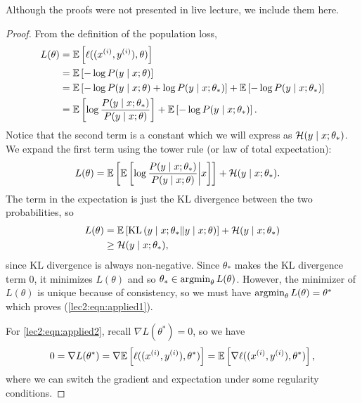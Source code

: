 Although the proofs were not presented in live lecture, we include them here.

\begin{proof}
From the definition of the population loss,
\begin{align}
    L(\theta) &= \mathbb{E} \left[ \ell((x^{(i)}, y^{(i)}), \theta) \right]\\
    &= \mathbb{E} \left[ - \log P(y \mid x; \theta) \right] \\
    &= \mathbb{E} \left[ - \log P(y \mid x; \theta) + \log P(y \mid x; \theta_*) \right] + \mathbb{E} \left[ - \log P(y \mid x; \theta_*) \right] \\
    &= \mathbb{E} \left[ \log \frac{P(y \mid x; \theta_*)}{P(y \mid x; \theta)} \right] + \mathbb{E} \left[ - \log P(y \mid x; \theta_*) \right].
\end{align}
Notice that the second term is a constant which we will express as $\mathcal H(y \mid x; \theta_*)$. We expand the first term using the tower rule (or law of total expectation):
\begin{align}
    L(\theta) &= \mathbb{E} \left[ \mathbb{E} \left[ \log \frac{P(y \mid x; \theta_*)}{P(y \mid x; \theta)} \biggr\vert x \right] \right] + \mathcal H(y \mid x; \theta_*).
\end{align}
The term in the expectation is just the KL divergence between the two probabilities, so 
\begin{align}
    L(\theta) &= \mathbb{E} \left[ \operatorname{KL} \left( y \mid x; \theta_* \| y \mid x; \theta \right) \right] + \mathcal H(y \mid x; \theta_*) \\
    &\geq \mathcal H(y \mid x; \theta_*),
\end{align}
since KL divergence is always non-negative. Since $\theta_*$ makes the KL divergence term 0, it minimizes $L(\theta)$ and so $\theta_* \in \operatorname*{\textup{argmin}}_\theta L(\theta)$. However, the minimizer of $L(\theta)$ is unique because of consistency, so  we must have $\operatorname*{\textup{argmin}}_\theta L(\theta) = \theta^*$ which proves (\ref{lec2:eqn:applied1}).

For \eqref{lec2:eqn:applied2}, recall $\nabla L(\theta^*) = 0$, so we have
\begin{equation}
0 = \nabla L(\theta^*) = \nabla \mathbb{E} \left[ \ell((x^{(i)}, y^{(i)}), \theta^*) \right] = \mathbb{E} \left[ \nabla \ell((x^{(i)}, y^{(i)}), \theta^*) \right],
\end{equation}
where we can switch the gradient and expectation under some regularity conditions.


\end{proof}
